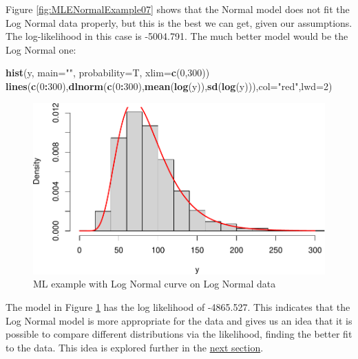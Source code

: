 \documentclass[
]{book}
\newenvironment{Shaded}{\begin{snugshade}}{\end{snugshade}}
\newcommand{\DataTypeTok}[1]{\textcolor[rgb]{0.13,0.29,0.53}{#1}}
\newcommand{\DecValTok}[1]{\textcolor[rgb]{0.00,0.00,0.81}{#1}}
\newcommand{\KeywordTok}[1]{\textcolor[rgb]{0.13,0.29,0.53}{\textbf{#1}}}
\newcommand{\NormalTok}[1]{#1}
\newcommand{\OperatorTok}[1]{\textcolor[rgb]{0.81,0.36,0.00}{\textbf{#1}}}
\newcommand{\StringTok}[1]{\textcolor[rgb]{0.31,0.60,0.02}{#1}}
\theoremstyle{definition}
\theoremstyle{definition}
\theoremstyle{definition}
\theoremstyle{definition}
\theoremstyle{remark}
\begin{document}
Figure \ref{fig:MLENormalExample07} shows that the Normal model does not fit the Log Normal data properly, but this is the best we can get, given our assumptions. The log-likelihood in this case is -5004.791. The much better model would be the Log Normal one:

\begin{Shaded}
\begin{Highlighting}[]
\KeywordTok{hist}\NormalTok{(y, }\DataTypeTok{main=}\StringTok{""}\NormalTok{, }\DataTypeTok{probability=}\NormalTok{T, }\DataTypeTok{xlim=}\KeywordTok{c}\NormalTok{(}\DecValTok{0}\NormalTok{,}\DecValTok{300}\NormalTok{))}
\KeywordTok{lines}\NormalTok{(}\KeywordTok{c}\NormalTok{(}\DecValTok{0}\OperatorTok{:}\DecValTok{300}\NormalTok{),}\KeywordTok{dlnorm}\NormalTok{(}\KeywordTok{c}\NormalTok{(}\DecValTok{0}\OperatorTok{:}\DecValTok{300}\NormalTok{),}\KeywordTok{mean}\NormalTok{(}\KeywordTok{log}\NormalTok{(y)),}\KeywordTok{sd}\NormalTok{(}\KeywordTok{log}\NormalTok{(y))),}\DataTypeTok{col=}\StringTok{"red"}\NormalTok{,}\DataTypeTok{lwd=}\DecValTok{2}\NormalTok{)}
\end{Highlighting}
\end{Shaded}

\begin{figure}
\centering
\includegraphics{Svetunkov---Statistics-for-Business-Analytics_files/figure-latex/MLENormalExample08-1.pdf}
\caption{\label{fig:MLENormalExample08}ML example with Log Normal curve on Log Normal data}
\end{figure}

The model in Figure \ref{fig:MLENormalExample08} has the log likelihood of -4865.527. This indicates that the Log Normal model is more appropriate for the data and gives us an idea that it is possible to compare different distributions via the likelihood, finding the better fit to the data. This idea is explored further in the \protect\hyperlink{modelSelection}{next section}.
\end{document}
